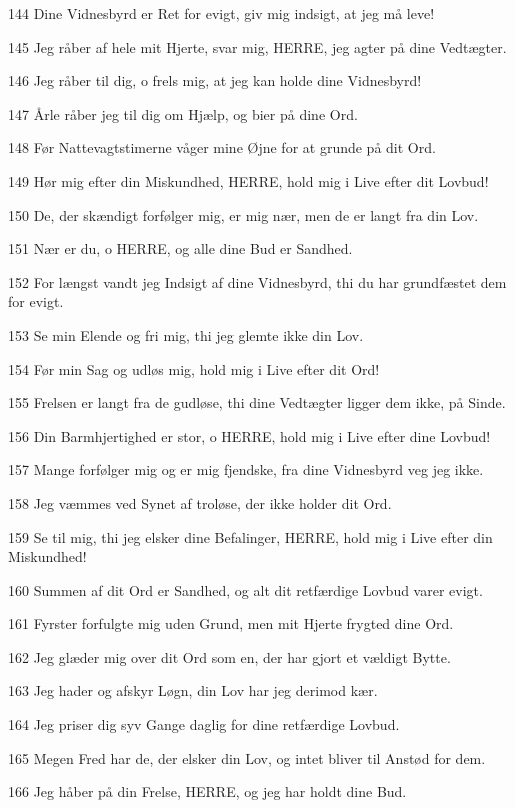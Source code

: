 \par 144 Dine Vidnesbyrd er Ret for evigt, giv mig indsigt, at jeg må leve!
\par 145 Jeg råber af hele mit Hjerte, svar mig, HERRE, jeg agter på dine Vedtægter.
\par 146 Jeg råber til dig, o frels mig, at jeg kan holde dine Vidnesbyrd!
\par 147 Årle råber jeg til dig om Hjælp, og bier på dine Ord.
\par 148 Før Nattevagtstimerne våger mine Øjne for at grunde på dit Ord.
\par 149 Hør mig efter din Miskundhed, HERRE, hold mig i Live efter dit Lovbud!
\par 150 De, der skændigt forfølger mig, er mig nær, men de er langt fra din Lov.
\par 151 Nær er du, o HERRE, og alle dine Bud er Sandhed.
\par 152 For længst vandt jeg Indsigt af dine Vidnesbyrd, thi du har grundfæstet dem for evigt.
\par 153 Se min Elende og fri mig, thi jeg glemte ikke din Lov.
\par 154 Før min Sag og udløs mig, hold mig i Live efter dit Ord!
\par 155 Frelsen er langt fra de gudløse, thi dine Vedtægter ligger dem ikke, på Sinde.
\par 156 Din Barmhjertighed er stor, o HERRE, hold mig i Live efter dine Lovbud!
\par 157 Mange forfølger mig og er mig fjendske, fra dine Vidnesbyrd veg jeg ikke.
\par 158 Jeg væmmes ved Synet af troløse, der ikke holder dit Ord.
\par 159 Se til mig, thi jeg elsker dine Befalinger, HERRE, hold mig i Live efter din Miskundhed!
\par 160 Summen af dit Ord er Sandhed, og alt dit retfærdige Lovbud varer evigt.
\par 161 Fyrster forfulgte mig uden Grund, men mit Hjerte frygted dine Ord.
\par 162 Jeg glæder mig over dit Ord som en, der har gjort et vældigt Bytte.
\par 163 Jeg hader og afskyr Løgn, din Lov har jeg derimod kær.
\par 164 Jeg priser dig syv Gange daglig for dine retfærdige Lovbud.
\par 165 Megen Fred har de, der elsker din Lov, og intet bliver til Anstød for dem.
\par 166 Jeg håber på din Frelse, HERRE, og jeg har holdt dine Bud.
